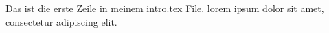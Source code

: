 Das ist die erste Zeile in meinem intro.tex File.
lorem ipsum dolor sit amet, consectetur adipiscing elit.
\cite{battledayCapturingHumanCategorization2020a}